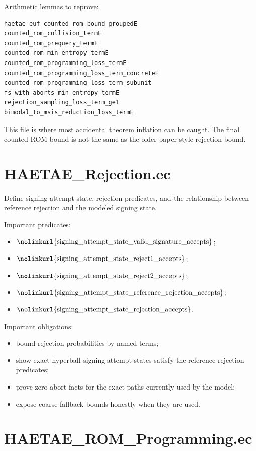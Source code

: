 \documentclass[11pt]{report}
\DeclareRobustCommand{\ec}[1]{\ifmmode\text{\nolinkurl{#1}}\else\nolinkurl{#1}\fi}
\theoremstyle{definition}
\theoremstyle{plain}
\begin{document}
Arithmetic lemmas to reprove:

\begin{lstlisting}[language=EasyCrypt]
haetae_euf_counted_rom_bound_groupedE
counted_rom_collision_termE
counted_rom_prequery_termE
counted_rom_min_entropy_termE
counted_rom_programming_loss_termE
counted_rom_programming_loss_term_concreteE
counted_rom_programming_loss_term_subunit
fs_with_aborts_min_entropy_termE
rejection_sampling_loss_term_ge1
bimodal_to_msis_reduction_loss_termE
\end{lstlisting}

This file is where most accidental theorem inflation can be caught.  The final
counted-ROM bound is not the same as the older paper-style rejection bound.

\section{HAETAE\_Rejection.ec}

Define signing-attempt state, rejection predicates, and the relationship
between reference rejection and the modeled signing state.

Important predicates:

\begin{itemize}
\item \(\ec{signing\_attempt\_state\_valid\_signature\_accepts}\);
\item \(\ec{signing\_attempt\_state\_reject1\_accepts}\);
\item \(\ec{signing\_attempt\_state\_reject2\_accepts}\);
\item \(\ec{signing\_attempt\_state\_reference\_rejection\_accepts}\);
\item \(\ec{signing\_attempt\_state\_rejection\_accepts}\).
\end{itemize}

Important obligations:

\begin{itemize}
\item bound rejection probabilities by named terms;
\item show exact-hyperball signing attempt states satisfy the reference
rejection predicates;
\item prove zero-abort facts for the exact paths currently used by the model;
\item expose coarse fallback bounds honestly when they are used.
\end{itemize}

\section{HAETAE\_ROM\_Programming.ec}
\end{document}
